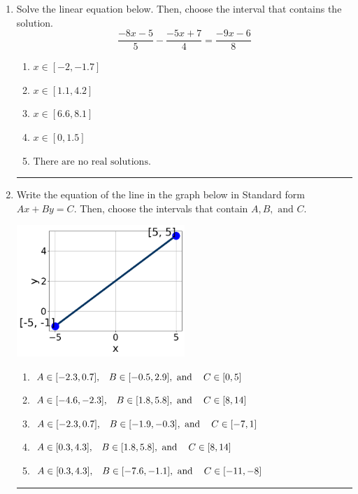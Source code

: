 \documentclass[14pt]{extbook}
\newcommand{\litem}[1]{\item#1\hspace*{-1cm}\rule{\textwidth}{0.4pt}}
\begin{document}
\begin{enumerate}
{\begin{enumerate}[label=\Alph*.]
\end{enumerate} }
\litem{
Solve the linear equation below. Then, choose the interval that contains the solution.\[ \frac{-8x -5}{5} - \frac{-5x + 7}{4} = \frac{-9x -6}{8} \]\begin{enumerate}[label=\Alph*.]
\item \( x \in [-2, -1.7] \)
\item \( x \in [1.1, 4.2] \)
\item \( x \in [6.6, 8.1] \)
\item \( x \in [0, 1.5] \)
\item \( \text{There are no real solutions.} \)

\end{enumerate} }
\litem{
Write the equation of the line in the graph below in Standard form $Ax+By=C$. Then, choose the intervals that contain $A, B, \text{ and } C$.
\begin{center}
    \includegraphics[width=0.5\textwidth]{../Figures/linearGraphToStandardCopyA.png}
\end{center}
\begin{enumerate}[label=\Alph*.]
\item \( A \in [-2.3, 0.7], \hspace{3mm} B \in [-0.5, 2.9], \text{ and } \hspace{3mm} C \in [0, 5] \)
\item \( A \in [-4.6, -2.3], \hspace{3mm} B \in [1.8, 5.8], \text{ and } \hspace{3mm} C \in [8, 14] \)
\item \( A \in [-2.3, 0.7], \hspace{3mm} B \in [-1.9, -0.3], \text{ and } \hspace{3mm} C \in [-7, 1] \)
\item \( A \in [0.3, 4.3], \hspace{3mm} B \in [1.8, 5.8], \text{ and } \hspace{3mm} C \in [8, 14] \)
\item \( A \in [0.3, 4.3], \hspace{3mm} B \in [-7.6, -1.1], \text{ and } \hspace{3mm} C \in [-11, -8] \)


\end{enumerate}}
\end{enumerate}
\end{document}
